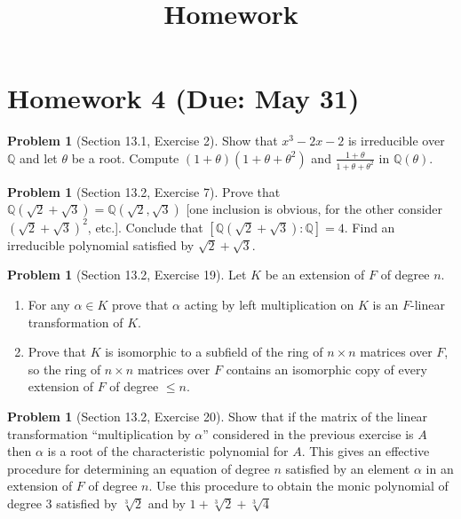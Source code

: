 \documentclass{amsart}
\title{Homework}
\numberwithin{equation}{section}
\theoremstyle{definition}
\newtheorem{problem}[thm]{Problem}
\begin{document}


\section{Homework 4 (Due: May 31)}

\begin{problem}[Section 13.1, Exercise 2]
  Show that \(x^3-2 x-2\) is irreducible over \(\mathbb{Q}\) and let \(\theta\) be a root. Compute \((1+\theta)\left(1+\theta+\theta^2\right)\) and \(\frac{1+\theta}{1+\theta+\theta^2}\) in \(\mathbb{Q}(\theta)\).
\end{problem}


\begin{problem}[Section 13.2, Exercise 7]
  Prove that \(\mathbb{Q}(\sqrt{2}+\sqrt{3})=\mathbb{Q}(\sqrt{2}, \sqrt{3})\) [one inclusion is obvious, for the other consider \((\sqrt{2}+\sqrt{3})^2\), etc.]. Conclude that \([\mathbb{Q}(\sqrt{2}+\sqrt{3}): \mathbb{Q}]=4\). Find an irreducible polynomial satisfied by \(\sqrt{2}+\sqrt{3}\).
\end{problem}

\begin{problem}[Section 13.2, Exercise 19]
Let \(K\) be an extension of \(F\) of degree \(n\).
\begin{enumerate}
\item For any \(\alpha \in K\) prove that \(\alpha\) acting by left multiplication on \(K\) is an \(F\)-linear transformation of \(K\).
\item Prove that \(K\) is isomorphic to a subfield of the ring of \(n \times n\) matrices over \(F\), so the ring of \(n \times n\) matrices over \(F\) contains an isomorphic copy of every extension of \(F\) of degree \(\leq n\).
\end{enumerate}

\end{problem}

\begin{problem}[Section 13.2, Exercise 20]
Show that if the matrix of the linear transformation ``multiplication by \(\alpha\)'' considered in the previous exercise is \(A\) then \(\alpha\) is a root of the characteristic polynomial for \(A\). This gives an effective procedure for determining an equation of degree \(n\) satisfied by an element \(\alpha\) in an extension of \(F\) of degree \(n\). Use this procedure to obtain the monic polynomial of degree 3 satisfied by \(\sqrt[3]{2}\) and by \(1+\sqrt[3]{2}+\sqrt[3]{4}\)
\end{problem}
\end{document}
